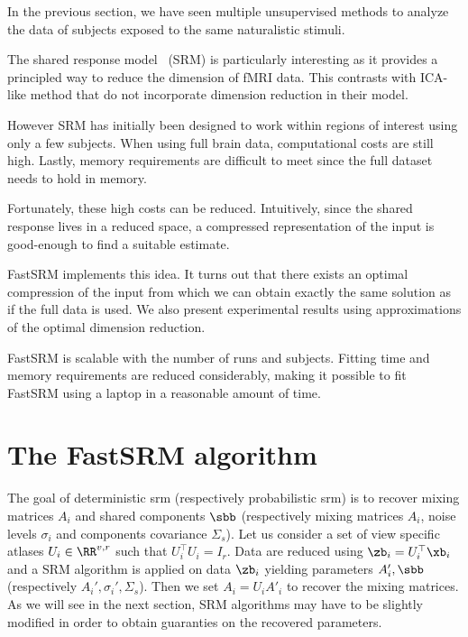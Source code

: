In the previous section, we have seen multiple unsupervised methods to analyze
the data of subjects exposed to the same naturalistic stimuli.

The shared response model~\cite{chen2015reduced} (SRM) is particularly
interesting as it provides a principled way to reduce the
dimension of fMRI data. This contrasts with ICA-like method that do not
incorporate dimension reduction in their model.

However SRM has initially been designed to work within regions of interest using
only a few subjects. When using full brain data, computational costs are still
high. Lastly, memory requirements are difficult to meet since the full dataset needs to hold
in memory.

Fortunately, these high costs can be reduced. Intuitively, since the shared
response lives in a reduced space, a compressed representation of the input is
good-enough to find a suitable estimate.

FastSRM implements this idea. It turns out that there exists an optimal
compression of the input from which we can obtain exactly the same solution as
if the full data is used. We also present experimental results using
approximations of the optimal dimension reduction.

FastSRM is scalable with the number of runs and subjects. Fitting time and memory requirements are reduced considerably, making it possible to fit FastSRM using a laptop in a reasonable amount of time.

\section{The FastSRM algorithm}
The goal of deterministic srm (respectively probabilistic srm) is to recover mixing matrices $A_i$ and shared
components $\sbb$ (respectively mixing matrices $A_i$, noise levels
$\sigma_i$ and components covariance $\Sigma_s$). 
Let us consider a set of view specific atlases $U_i \in \RR^{v, r}$ such that
$U_i^{\top}U_i = I_r$.
Data are reduced using $\zb_i = U_i^{\top} \xb_i$ and a SRM algorithm is applied
on data $\zb_i$ yielding parameters $A_i', \sbb$ (respectively $A_i',
\sigma_i', \Sigma_s$). Then we set $A_i = U_i A'_i$ to recover the mixing matrices.
As we will see in the next section, SRM algorithms may have to be slightly
modified in order to obtain guaranties on the recovered parameters.

